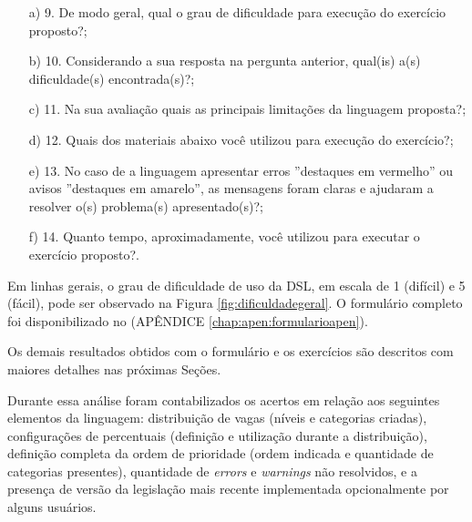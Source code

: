 \begin{enumerate}

    \item[a)] 9. De modo geral, qual o grau de dificuldade para execução do exercício proposto?;
    
    \item[b)] 10. Considerando a sua resposta na pergunta anterior, qual(is) a(s) dificuldade(s) encontrada(s)?;
    
    \item[c)] 11. Na sua avaliação quais as principais limitações da linguagem proposta?;
    
   \item[d)]  12. Quais dos materiais abaixo você utilizou para execução do exercício?;
   
   \item[e)] 13. No caso de a linguagem apresentar erros ''destaques em vermelho'' ou avisos ''destaques em amarelo'', as mensagens foram claras e ajudaram a resolver o(s) problema(s) apresentado(s)?;
   
   \item[f)] 14. Quanto tempo, aproximadamente, você utilizou para executar o exercício proposto?.   

\end{enumerate}

Em linhas gerais, o grau de dificuldade de uso da DSL, em escala de 1 (difícil) e 5 (fácil), pode ser observado na Figura \ref{fig:dificuldadegeral}. O formulário completo foi disponibilizado no (APÊNDICE \ref{chap:apen:formularioapen}). 



\newpage
Os demais resultados obtidos com o formulário e os exercícios são descritos com maiores detalhes nas próximas Seções.






Durante essa análise foram contabilizados os acertos em relação aos seguintes elementos da linguagem: distribuição de vagas (níveis e categorias criadas), configurações de percentuais (definição e utilização durante a distribuição), definição completa da ordem de prioridade (ordem indicada e quantidade de categorias presentes), quantidade de \textit{errors} e \textit{warnings} não resolvidos, e a presença de versão da legislação mais recente implementada opcionalmente por alguns usuários.

